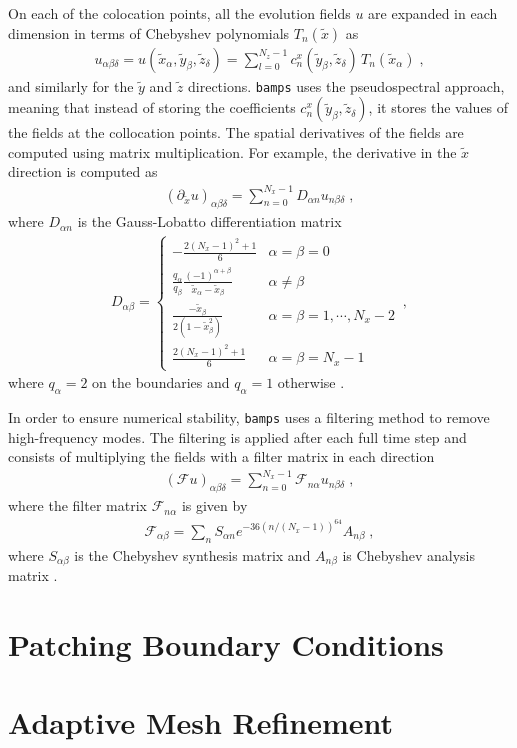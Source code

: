 On each of the colocation points, all the evolution fields $u$ are expanded in each dimension in terms of Chebyshev polynomials $T_n(\tilde{x})$ as
%
\begin{align}
    u_{\alpha \beta \delta} = u(\tilde{x}_\alpha, \tilde{y}_\beta, \tilde{z}_\delta) = \sum_{l=0}^{N_z -1} c^x_n(\tilde{y}_\beta, \tilde{z}_\delta) \, T_n(\tilde{x}_\alpha) \; ,
\end{align}
%
and similarly for the $\tilde{y}$ and $\tilde{z}$ directions. \texttt{bamps} uses the pseudospectral approach, meaning that instead of storing the coefficients $c^x_n(\tilde{y}_\beta, \tilde{z}_\delta)$, it stores the values of the fields at the collocation points. The spatial derivatives of the fields are computed using matrix multiplication. For example, the derivative in the $\tilde{x}$ direction is computed as
%
\begin{align}
    (\partial_{\tilde{x}} u)_{\alpha \beta \delta} = \sum_{n=0}^{N_x -1} D_{\alpha n} u_{n \beta \delta} \; ,
\end{align}
%
where $D_{\alpha n}$ is the Gauss-Lobatto differentiation matrix
%
\begin{align}
    D_{\alpha\beta}=
    \begin{cases}
    -\frac{2(N_x-1)^2+1}{6} & \alpha=\beta=0 \\
    \frac{q_\alpha}{q_\beta}\frac{(-1)^{\alpha+\beta}}{\tilde{x}_\alpha-\tilde{x}_\beta} & \alpha\neq\beta \\
    \frac{-\tilde{x}_\beta}{2(1-\tilde{x}_\beta^2)} & \alpha=\beta=1,\cdots,N_x-2 \\
    \frac{2(N_x-1)^2+1}{6} & \alpha=\beta=N_x-1
    \end{cases} \, ,
\end{align}
%
where $q_\alpha = 2$ on the boundaries and $q_\alpha = 1$ otherwise \cite{Pseudospectral_method_for_gravitational_wave_collapse}.

In order to ensure numerical stability, \texttt{bamps} uses a filtering method to remove high-frequency modes. The filtering is applied after each full time step and consists of multiplying the fields with a filter matrix in each direction
%
\begin{align}
    (\mathcal{F}u)_{\alpha \beta \delta} = \sum_{n=0}^{N_x -1} \mathcal{F}_{n \alpha} u_{n \beta \delta} \; ,
\end{align}
%
where the filter matrix $\mathcal{F}_{n \alpha}$ is given by
%
\begin{align}
    \mathcal{F}_{\alpha \beta} = \sum_n S_{\alpha n} e^{-36 (n/(N_x - 1))^{64}} A_{n \beta} \; ,
\end{align}
%
where $S_{\alpha \beta}$ is the Chebyshev synthesis matrix and $A_{n \beta}$ is Chebyshev analysis matrix \cite{Pseudospectral_method_for_gravitational_wave_collapse}.

\section{Patching Boundary Conditions}
\label{section:Patch_Boundaries}


\section{Adaptive Mesh Refinement}
\label{section:amr}
